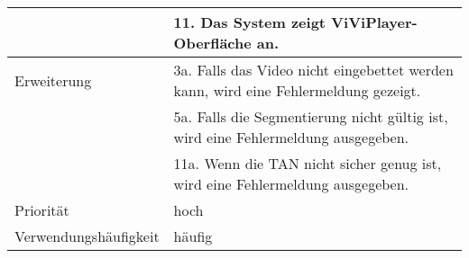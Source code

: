 \begin{tabularx}{\linewidth}{|l|X|}
							& 11. Das System zeigt ViViPlayer-Oberfläche an. \\ \hline
	Erweiterung				& 3a. Falls das Video nicht eingebettet werden kann, wird eine Fehlermeldung 
							  gezeigt. \\
							& 5a. Falls die Segmentierung nicht gültig ist, wird eine Fehlermeldung 
							  ausgegeben. \\
							& 11a. Wenn die TAN nicht sicher genug ist, wird eine Fehlermeldung ausgegeben.
							  \\ \hline
	Priorität				& hoch \\ \hline
	Verwendungshäufigkeit	& häufig \\ \hline
\end{tabularx}